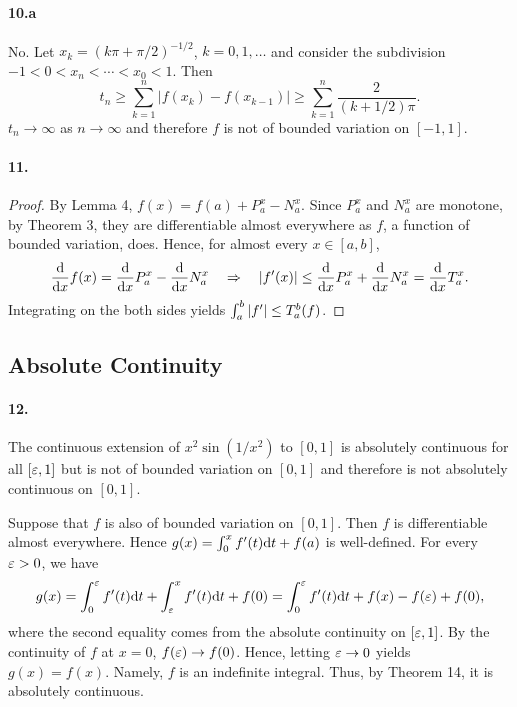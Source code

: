   \paragraph{10.a}
  \begin{solution}
    No. Let $x_k = (k\pi+\pi/2)^{-1/2}$, $k=0,1,\dots$ and consider the 
    subdivision $-1<0<x_n<\cdots<x_0<1$. Then
    \[
      t_n \ge \sum_{k=1}^n|f(x_k)-f(x_{k-1})|
      \ge\sum_{k=1}^n\frac{2}{(k+1/2)\pi}.
    \]
    $t_n\to\infty$ as $n\to\infty$ and therefore $f$ is not of bounded 
    variation on $[-1,1]$.
  \end{solution}

  \paragraph{11.}
  \begin{proof}
    By Lemma 4, $f(x)=f(a)+P_a^x-N_a^x$. Since $P_a^x$ and $N_a^x$ are monotone,
    by Theorem 3, they are differentiable almost everywhere as $f$, a function 
    of bounded variation, does. Hence, for almost every $x\in[a,b]$,
    \[
      \frac{\mathrm{d}}{\mathrm{d} x}f(x) = \frac{\mathrm{d}}{\mathrm{d} x}P_a^x - \frac{\mathrm{d}}{\mathrm{d} x}N_a^x
      \quad\Rightarrow\quad
      |f^\prime(x)| \le \frac{\mathrm{d}}{\mathrm{d} x}P_a^x+\frac{\mathrm{d}}{\mathrm{d} x}N_a^x = 
      \frac{\mathrm{d}}{\mathrm{d} x}T_a^x.
    \]
    Integrating on the both sides yields $\int_a^b|f^\prime|\le T_a^b(f)$.
  \end{proof}


\setcounter{subsection}{3}
\subsection{Absolute Continuity}
  \paragraph{12.}
  \begin{solution}
    The continuous extension of $x^2\sin(1/x^2)$ to $[0,1]$ is absolutely 
    continuous for all $[\varepsilon, 1]$ but is not of bounded variation on $[0,1]$
    and therefore is not absolutely continuous on $[0,1]$.\par
    Suppose that $f$ is also of bounded variation on $[0,1]$. Then $f$ is 
    differentiable almost everywhere. Hence $g(x)=\int_0^xf^\prime(t)\mathrm{d} t+f(a)$ is
    well-defined. For every $\varepsilon>0$, we have
    \[
      g(x) = \int_0^\varepsilon f^\prime(t)\mathrm{d} t+\int_\varepsilon^x f^\prime(t)\mathrm{d} t + f(0)
      = \int_0^\varepsilon f^\prime(t)\mathrm{d} t + f(x) - f(\varepsilon) + f(0),
    \]
    where the second equality comes from the absolute continuity on $[\varepsilon,1]$.
    By the continuity of $f$ at $x=0$, $f(\varepsilon)\to f(0)$. Hence, letting $\varepsilon
    \to 0$ yields $g(x)=f(x)$. Namely, $f$ is an indefinite integral. Thus, by
    Theorem 14, it is absolutely continuous.
  \end{solution}


